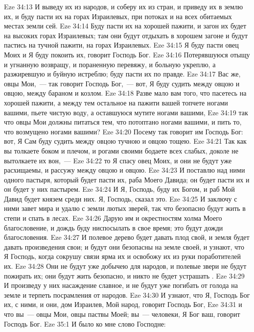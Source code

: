 \vs Eze 34:13 И выведу их из народов, и соберу их из стран, и приведу их в землю их, и буду пасти их на горах Израилевых, при потоках и на всех обитаемых местах земли сей.
\vs Eze 34:14 Буду пасти их на хорошей пажити, и загон их будет на высоких горах Израилевых; там они будут отдыхать в хорошем загоне и будут пастись на тучной пажити, на горах Израилевых.
\vs Eze 34:15 Я буду пасти овец Моих и Я буду покоить их, говорит Господь Бог.
\vs Eze 34:16 Потерявшуюся отыщу и угнанную возвращу, и пораненную перевяжу, и больную укреплю, а разжиревшую и буйную истреблю; буду пасти их по правде.
\vs Eze 34:17 Вас же, овцы Мои,~--- так говорит Господь Бог,~--- вот, Я буду судить между овцою и овцою, между бараном и козлом.
\vs Eze 34:18 Разве мало вам того, что пасетесь на хорошей пажити, а между тем остальное на пажити вашей топчете ногами вашими, пьете чистую воду, а оставшуюся мутите ногами вашими,
\vs Eze 34:19 так что овцы Мои должны питаться тем, что потоптано ногами вашими, и пить то, что возмущено ногами вашими?
\vs Eze 34:20 Посему так говорит им Господь Бог: вот, Я Сам буду судить между овцою тучною и овцою тощею.
\vs Eze 34:21 Так как вы толкаете боком и плечом, и рогами своими бодаете всех слабых, доколе не вытолкаете их вон,~---
\vs Eze 34:22 то Я спасу овец Моих, и они не будут уже расхищаемы, и рассужу между овцою и овцою.
\vs Eze 34:23 И поставлю над ними одного пастыря, который будет пасти их, раба Моего Давида; он будет пасти их и он будет у них пастырем.
\vs Eze 34:24 И Я, Господь, буду их Богом, и раб Мой Давид будет князем среди них. Я, Господь, сказал это.
\vs Eze 34:25 И заключу с ними завет мира и удалю с земли лютых зверей, так что безопасно будут жить в степи и спать в лесах.
\vs Eze 34:26 Дарую им и окрестностям холма Моего благословение, и дождь буду ниспосылать в свое время; это будут дожди благословения.
\vs Eze 34:27 И полевое дерево будет давать плод свой, и земля будет давать произведения свои; и будут они безопасны на земле своей, и узнают, что Я Господь, когда сокрушу связи ярма их и освобожу их из руки поработителей их.
\vs Eze 34:28 Они не будут уже добычею для народов, и полевые звери не будут пожирать их; они будут жить безопасно, и никто не будет устрашать .
\vs Eze 34:29 И произведу у них насаждение славное, и не будут уже погибать от голода на земле и терпеть посрамления от народов.
\vs Eze 34:30 И узнают, что Я, Господь Бог их, с ними, и они, дом Израилев, Мой народ, говорит Господь Бог,
\vs Eze 34:31 и что вы~--- овцы Мои, овцы паствы Моей; вы~--- человеки,  Я Бог ваш, говорит Господь Бог.
\vs Eze 35:1 И было ко мне слово Господне:
